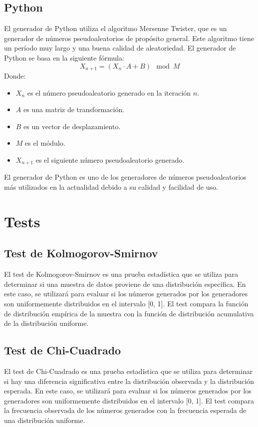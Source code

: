 \documentclass{article}
\begin{document}
\subsection{Python}
El generador de Python utiliza el algoritmo Mersenne Twister, que es un generador de números pseudoaleatorios de propósito general. Este algoritmo tiene un período muy largo y una buena calidad de aleatoriedad. El generador de Python se basa en la siguiente fórmula:
\begin{equation}
    X_{n+1} = (X_n \cdot A + B) \mod M
\end{equation}
Donde:
\begin{itemize}
    \item $X_n$ es el número pseudoaleatorio generado en la iteración $n$.
    \item $A$ es una matriz de transformación.
    \item $B$ es un vector de desplazamiento.
    \item $M$ es el módulo.
    \item $X_{n+1}$ es el siguiente número pseudoaleatorio generado.
\end{itemize}
El generador de Python es uno de los generadores de números pseudoaleatorios más utilizados en la actualidad debido a su calidad y facilidad de uso.

\section{Tests}
\subsection{Test de Kolmogorov-Smirnov}
El test de Kolmogorov-Smirnov es una prueba estadística que se utiliza para determinar si una muestra de datos proviene de una distribución específica. En este caso, se utilizará para evaluar si los números generados por los generadores son uniformemente distribuidos en el intervalo [0, 1]. El test compara la función de distribución empírica de la muestra con la función de distribución acumulativa de la distribución uniforme.
\subsection{Test de Chi-Cuadrado}
El test de Chi-Cuadrado es una prueba estadística que se utiliza para determinar si hay una diferencia significativa entre la distribución observada y la distribución esperada. En este caso, se utilizará para evaluar si los números generados por los generadores son uniformemente distribuidos en el intervalo [0, 1]. El test compara la frecuencia observada de los números generados con la frecuencia esperada de una distribución uniforme.
\end{document}
